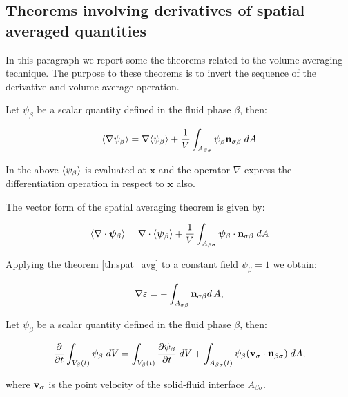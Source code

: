 \subsection{Theorems involving derivatives of spatial averaged quantities}

In this paragraph we report some the theorems related to the volume averaging technique. The purpose to these theorems is to invert the sequence of the  derivative and volume average operation.

\begin{theorem}
Let $\psi_{\beta}$ be a scalar quantity defined in the fluid phase $\beta$, then:

	\begin{equation}
		{\left< \nabla \psi_{\beta} \right>} = \nabla {\left< \psi_{\beta} \right>} + \dfrac{1}{V} \int_{A_{\beta \sigma}} \psi_{\beta} \mathbf{n}_{\sigma \beta}   \;dA
			\label{th:spat_avg}
	\end{equation}
\end{theorem}

In the above ${\left< \psi_{\beta} \right>}$ is evaluated at $\mathbf{x}$ and the operator $\nabla$ express the differentiation operation in respect to $\mathbf{x}$ also.

\begin{corollary}
	The vector form of the spatial averaging theorem is given by:
	
	\begin{equation}
	{\left< \nabla \cdot \boldsymbol{\psi}_{\beta} \right>} = \nabla \cdot {\left<  \boldsymbol{\psi}_{\beta} \right>} + \dfrac{1}{V} \int_{A_{\beta \sigma}}  \boldsymbol{\psi}_{\beta} \cdot \mathbf{n}_{\sigma \beta} \;dA
			\label{th:vec_spat_avg}
	\end{equation}
\end{corollary}

\begin{corollary}
	Applying the theorem \eqref{th:spat_avg} to a constant field $\psi_{\beta} = 1$ we obtain:
	
	\begin{equation}
		\nabla \varepsilon = - \int_{A_{\sigma \beta}} \mathbf{n}_{\sigma \beta} d \, A,
	\end{equation}
\end{corollary}


\begin{theorem}
	Let $\psi_{\beta}$ be a scalar quantity defined in the fluid phase $\beta$, then:
	
	\begin{equation}
	\dfrac{\partial}{\partial t} \int_{V_\beta(t)} \psi_{\beta} \; dV =  \int_{V_\beta(t)} \dfrac{\partial \psi_{\beta}}{\partial t} \; dV + \int_{A_{\beta \sigma}(t)} \psi_{\beta} (\textbf{v}_{\sigma} \cdot \mathbf{n}_{\beta \sigma} ) \;dA,
	\label{th:transport}
	\end{equation}
	
	where $\textbf{v}_{\sigma}$ is the point velocity of the solid-fluid interface $A_{\beta \sigma}$.
\end{theorem}

